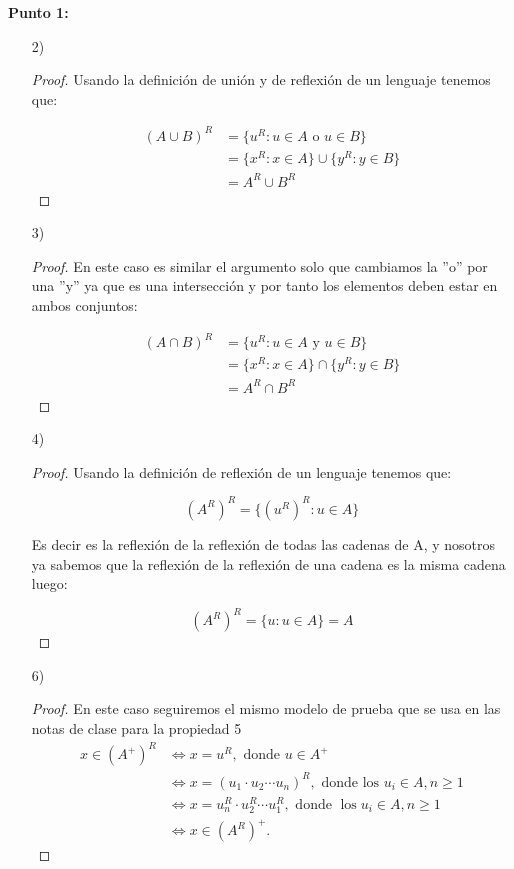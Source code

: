 \textbf{Punto 1:}

\begin{itemize}
    \item[2)]
    \begin{proof}
        Usando la definición de unión y de reflexión de un lenguaje tenemos que:

\begin{align*}
    (A \cup B)^R&=\{u^R: u \in A \text{ o } u\in B\}\\
    &=\{x^R: x\in A\}\cup\{y^R: y \in B\}\\
    &=A^R\cup B^R
\end{align*}  
    \end{proof}

    \item[3)] 

    \begin{proof}
        En este caso es similar el argumento solo que cambiamos la ''o'' por una ''y'' ya que es una intersección y por tanto los elementos deben estar en ambos conjuntos:

        \begin{align*}
              (A \cap B)^R&=\{u^R: u \in A \text{ y } u\in B\}\\
    &=\{x^R: x\in A\}\cap\{y^R: y \in B\}\\
    &=A^R\cap B^R
        \end{align*}
    \end{proof}

    \item[4)]\begin{proof}
        Usando la definición de reflexión de un lenguaje tenemos que:

        $$(A^R)^R=\{(u^R)^R:u\in A\}$$

        Es decir es la reflexión de la reflexión de todas las cadenas de A, y nosotros ya sabemos que la reflexión de la reflexión de una cadena es la misma cadena luego:

        $$(A^R)^R=\{u: u \in A\}=A$$

    \end{proof}

     \item[6)] 
   \begin{proof}En este caso seguiremos el mismo modelo de prueba que se usa en las notas de clase para la propiedad 5
        $$
    \begin{aligned}
    x \in\left(A^+\right)^R & \Longleftrightarrow x=u^R, \text { donde } u \in A^+ \\
    & \Longleftrightarrow x=\left(u_1 \cdot u_2 \cdots u_n\right)^R, \text { donde los } u_i \in A, n \geq 1 \\
    & \Longleftrightarrow x=u_n^R \cdot u_2^R \cdots u_1^R, \text { donde } \operatorname{los} u_i \in A, n \geq 1 \\
    & \Longleftrightarrow x \in\left(A^R\right)^+ .
    \end{aligned}
    $$
   \end{proof}
\end{itemize}

